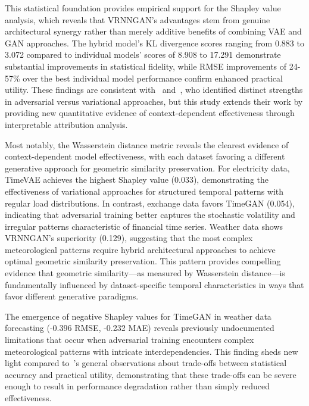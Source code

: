 \documentclass{article}
\begin{document}
This statistical foundation provides empirical support for the Shapley value analysis, which reveals that VRNNGAN's advantages stem from genuine architectural synergy rather than merely additive benefits of combining VAE and GAN approaches. The hybrid model's KL divergence scores ranging from 0.883 to 3.072 compared to individual models' scores of 8.908 to 17.291 demonstrate substantial improvements in statistical fidelity, while RMSE improvements of 24-57\% over the best individual model performance confirm enhanced practical utility. These findings are consistent with~\cite{yoon_time-series_2019} and~\cite{desai_timevae_2021}, who identified distinct strengths in adversarial versus variational approaches, but this study extends their work by providing new quantitative evidence of context-dependent effectiveness through interpretable attribution analysis.

Most notably, the Wasserstein distance metric reveals the clearest evidence of context-dependent model effectiveness, with each dataset favoring a different generative approach for geometric similarity preservation. For electricity data, TimeVAE achieves the highest Shapley value (0.033), demonstrating the effectiveness of variational approaches for structured temporal patterns with regular load distributions. In contrast, exchange data favors TimeGAN (0.054), indicating that adversarial training better captures the stochastic volatility and irregular patterns characteristic of financial time series. Weather data shows VRNNGAN's superiority (0.129), suggesting that the most complex meteorological patterns require hybrid architectural approaches to achieve optimal geometric similarity preservation. This pattern provides compelling evidence that geometric similarity—as measured by Wasserstein distance—is fundamentally influenced by dataset-specific temporal characteristics in ways that favor different generative paradigms.

The emergence of negative Shapley values for TimeGAN in weather data forecasting (-0.396 RMSE, -0.232 MAE) reveals previously undocumented limitations that occur when adversarial training encounters complex meteorological patterns with intricate interdependencies. This finding sheds new light compared to~\cite{lu_machine_2024}'s general observations about trade-offs between statistical accuracy and practical utility, demonstrating that these trade-offs can be severe enough to result in performance degradation rather than simply reduced effectiveness.
\end{document}
